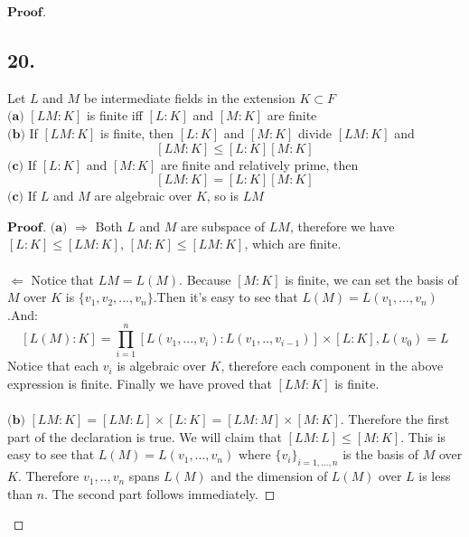 \documentclass[a4paper, 11pt]{article}
\newenvironment{myprf}
{\renewcommand\qedsymbol{$ $}\begin{proof}[$\mathbf{Proof}$]}
  {\end{proof}}
\begin{document}
\begin{myprf}
 \subsection*{20.}
 Let $L$ and $M$ be intermediate fields in the extension $K\subset F$\\
 $\textbf{(a)}$ $[LM:K]$ is finite iff $[L:K]$ and $[M:K]$ are finite\\
 $\textbf{(b)}$ If $[LM:K]$ is finite, then $[L:K]$ and $[M:K]$ divide $[LM:K]$ and
 $$
 [LM:K]\leq [L:K][M:K]
 $$
 $\textbf{(c)}$ If $[L:K]$ and $[M:K]$ are finite and relatively prime, then
 $$
 [LM:K]=[L:K][M:K]
 $$
 $\textbf{(c)}$ If $L$ and $M$ are algebraic over $K$, so is $LM$
 \begin{myprf}
        $\textbf{(a)}$ $\Rightarrow$ Both $L$ and $M$ are subspace of $LM$, therefore 
        we have $[L:K] \leq [LM:K]$, $[M:K]\leq [LM:K]$, which are finite.\\
        \vspace{0.3cm}
        \\
        $\Leftarrow$ Notice that $LM=L(M)$. Because $[M:K]$ is finite, we can set the 
        basis of $M$ over $K$ is $\{v_1,v_2,...,v_n\}$.Then it's easy to see that 
        $L(M)=L(v_1,...,v_n)$.And:
        $$
        [L(M):K]=\prod_{i=1}^{n}[L(v_1,...,v_{i}):L(v_1,..,v_{i-1})]\times[L:K], L(v_0)=L
        $$
        Notice that each $v_i$ is algebraic over $K$, therefore each component in the 
        above expression is finite. Finally we have proved that $[LM:K]$ is finite.\\
        \vspace{0.3cm}
        \\
        $\textbf{(b)}$ $[LM:K]=[LM:L]\times[L:K]=[LM:M]\times[M:K]$. Therefore the first
        part of the declaration is true. We will claim that $[LM:L]\leq [M:K]$. This is
        easy to see that $L(M)=L(v_1,...,v_n)$ where $\{v_i\}_{i=1,...,n}$ is the basis
        of $M$ over $K$. Therefore $v_1,..,v_n$ spans $L(M)$ and the dimension of $L(M)$
        over $L$ is less than $n$. The second part follows immediately.
         
 \end{myprf}


        

        

         
 \end{myprf}
\end{document}

